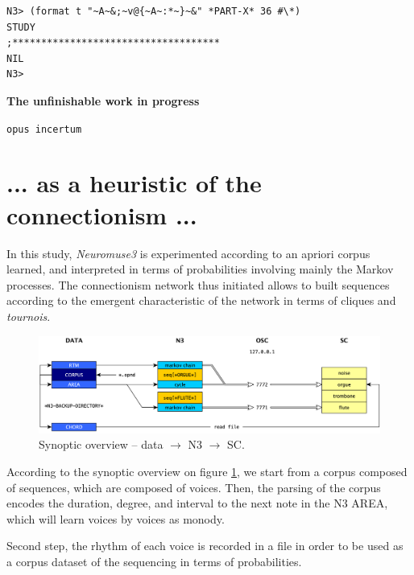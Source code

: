 \documentclass{article}
\begin{document}


\pagecolor{white}
\begin{lstlisting}[language=sectitle]
N3> (format t "~A~&;~v@{~A~:*~}~&" *PART-X* 36 #\*)
STUDY
;************************************
NIL
N3> 
\end{lstlisting}

\bigskip
\begin{center}
{\Large \textbf{The unfinishable work in progress}}

\texttt{opus incertum}
\end{center}

\section{... as a heuristic of the connectionism ...}
\label{ann:color}

\bigskip

In this study, \textsl{Neuromuse3} is experimented according to an apriori corpus learned, and interpreted in terms of probabilities involving mainly the Markov processes. The connectionism network thus initiated allows to built sequences according to the emergent characteristic of the network in terms of cliques and \textit{tournois}.

\begin{figure}[h]
\centering
\includegraphics[width=\textwidth]{../img/9901}
\caption{Synoptic overview -- data $\rightarrow$ N3 $\rightarrow$ SC.}
\label{global}
\end{figure}

According to the synoptic overview on figure \ref{global}, we start from a corpus composed of sequences, which are composed of voices. Then, the parsing of the corpus encodes the duration, degree, and interval to the next note in the N3 AREA, which will learn voices by voices as monody. 

Second step, the rhythm of each voice is recorded in a file in order to be used as a corpus dataset of the sequencing in terms of probabilities.
\end{document}
